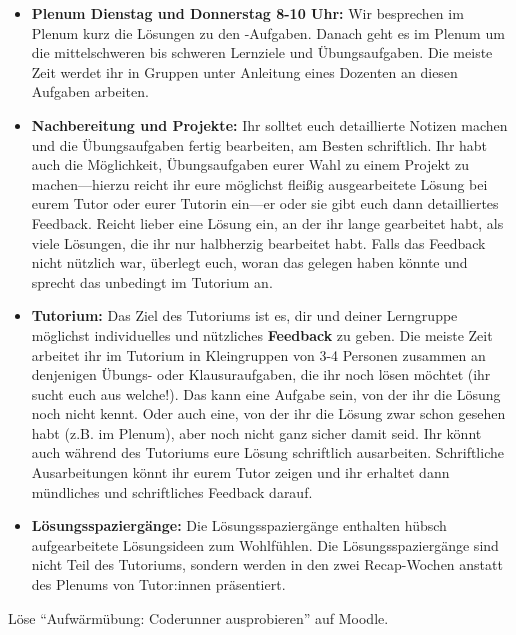 \documentclass{uebung_cs}
\begin{document}
\begin{exercise}
\begin{enumerate}
\begin{itemize}
      \item\textbf{Plenum Dienstag und Donnerstag 8-10 Uhr:}
      Wir besprechen im Plenum kurz die Lösungen zu den \athome-Aufgaben.
      Danach geht es im Plenum um die mittelschweren bis schweren Lernziele und Übungsaufgaben.
      Die meiste Zeit werdet ihr in Gruppen unter Anleitung eines Dozenten an diesen Aufgaben arbeiten.
      \item\textbf{Nachbereitung und Projekte:}
      Ihr solltet euch detaillierte Notizen machen und die Übungsaufgaben fertig bearbeiten, am Besten schriftlich.
      Ihr habt auch die Möglichkeit, Übungsaufgaben eurer Wahl zu einem Projekt zu machen---hierzu reicht ihr eure möglichst fleißig ausgearbeitete Lösung bei eurem Tutor oder eurer Tutorin ein---er oder sie gibt euch dann detailliertes Feedback.
      Reicht lieber eine Lösung ein, an der ihr lange gearbeitet habt, als viele Lösungen, die ihr nur halbherzig bearbeitet habt.
      Falls das Feedback nicht nützlich war, überlegt euch, woran das gelegen haben könnte und sprecht das unbedingt im Tutorium an.
      \item\textbf{Tutorium:}
      Das Ziel des Tutoriums ist es, dir und deiner Lerngruppe möglichst individuelles und nützliches \textbf{Feedback} zu geben.
      Die meiste Zeit arbeitet ihr im Tutorium in Kleingruppen von 3-4 Personen zusammen an denjenigen Übungs- oder Klausuraufgaben, die ihr noch lösen möchtet (ihr sucht euch aus welche!).
      Das kann eine Aufgabe sein, von der ihr die Lösung noch nicht kennt.
      Oder auch eine, von der ihr die Lösung zwar schon gesehen habt (z.B. im Plenum), aber noch nicht ganz sicher damit seid.
      Ihr könnt auch während des Tutoriums eure Lösung schriftlich ausarbeiten. Schriftliche Ausarbeitungen könnt ihr eurem Tutor zeigen und ihr erhaltet dann mündliches und schriftliches Feedback darauf.
      \item\textbf{Lösungsspaziergänge:}
      Die Lösungsspaziergänge enthalten hübsch aufgearbeitete Lösungsideen zum Wohlfühlen.
      Die Lösungsspaziergänge sind nicht Teil des Tutoriums, sondern werden in den zwei Recap-Wochen anstatt des Plenums von Tutor:innen präsentiert.
    \end{itemize}
    \end{enumerate}
\end{exercise}

\newpage
\begin{exercise}
  Löse \enquote{Aufwärmübung: Coderunner ausprobieren} auf Moodle.
\end{exercise}
\end{document}
